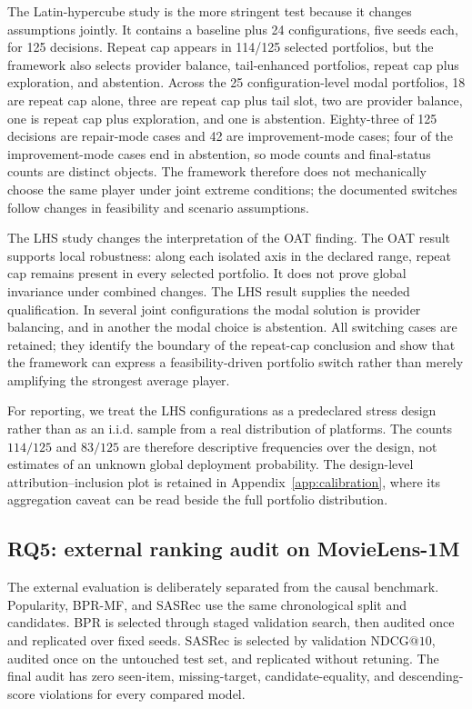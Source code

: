 \documentclass[review]{elsarticle}
\makeatletter
\theoremstyle{plain}
\theoremstyle{definition}
\theoremstyle{remark}
\newcommand{\NDCG}{\mathrm{NDCG@10}}
\makeatother
\begin{document}
The Latin-hypercube study is the more stringent test because it changes assumptions jointly. It contains a baseline plus 24 configurations, five seeds each, for 125 decisions. Repeat cap appears in 114/125 selected portfolios, but the framework also selects provider balance, tail-enhanced portfolios, repeat cap plus exploration, and abstention. Across the 25 configuration-level modal portfolios, 18 are repeat cap alone, three are repeat cap plus tail slot, two are provider balance, one is repeat cap plus exploration, and one is abstention. Eighty-three of 125 decisions are repair-mode cases and 42 are improvement-mode cases; four of the improvement-mode cases end in abstention, so mode counts and final-status counts are distinct objects. The framework therefore does not mechanically choose the same player under joint extreme conditions; the documented switches follow changes in feasibility and scenario assumptions.

The LHS study changes the interpretation of the OAT finding. The OAT result supports local robustness: along each isolated axis in the declared range, repeat cap remains present in every selected portfolio. It does not prove global invariance under combined changes. The LHS result supplies the needed qualification. In several joint configurations the modal solution is provider balancing, and in another the modal choice is abstention. All switching cases are retained; they identify the boundary of the repeat-cap conclusion and show that the framework can express a feasibility-driven portfolio switch rather than merely amplifying the strongest average player.

For reporting, we treat the LHS configurations as a predeclared stress design rather than as an i.i.d. sample from a real distribution of platforms. The counts $114/125$ and $83/125$ are therefore descriptive frequencies over the design, not estimates of an unknown global deployment probability. The design-level attribution--inclusion plot is retained in Appendix~\ref{app:calibration}, where its aggregation caveat can be read beside the full portfolio distribution.

\subsection{RQ5: external ranking audit on MovieLens-1M}\label{sec:rq4}

The external evaluation is deliberately separated from the causal benchmark. Popularity, BPR-MF, and SASRec use the same chronological split and candidates. BPR is selected through staged validation search, then audited once and replicated over fixed seeds. SASRec is selected by validation $\NDCG$, audited once on the untouched test set, and replicated without retuning. The final audit has zero seen-item, missing-target, candidate-equality, and descending-score violations for every compared model.
\end{document}
